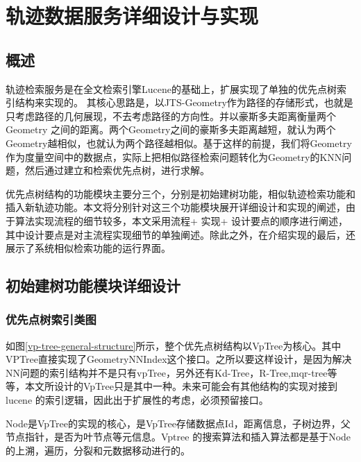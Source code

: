 \chapter{轨迹数据服务详细设计与实现}

\section{概述}
轨迹检索服务是在全文检索引擎Lucene的基础上，扩展实现了单独的优先点树索引结构来实现的。
其核心思路是，以JTS-Geometry作为路径的存储形式，也就是只考虑路径的几何展现，不去考虑路径的方向性。并以豪斯多夫距离衡量两个Geometry 之间的距离。两个Geometry之间的豪斯多夫距离越短，就认为两个Geometry越相似，也就认为两个路径越相似。基于这样的前提，我们将Geometry作为度量空间中的数据点，实际上把相似路径检索问题转化为Geometry的KNN问题，然后通过建立和检索优先点树，进行求解。

优先点树结构的功能模块主要分三个，分别是初始建树功能，相似轨迹检索功能和插入新轨迹功能。本文将分别针对这三个功能模块展开详细设计和实现的阐述，由于算法实现流程的细节较多，本文采用流程+ 实现+ 设计要点的顺序进行阐述，其中设计要点是对主流程实现细节的单独阐述。除此之外，在介绍实现的最后，还展示了系统相似检索功能的运行界面。

\section{初始建树功能模块详细设计}
\subsection{优先点树索引类图}
如图\ref{vp-tree-general-structure}所示，整个优先点树结构以VpTree为核心。其中VPTree直接实现了GeometryNNIndex这个接口。之所以要这样设计，是因为解决NN问题的索引结构并不是只有vpTree，另外还有Kd-Tree，R-Tree,mqr-tree等等\cite{DBLP:conf/nbis/Osborn17}，本文所设计的VpTree只是其中一种。未来可能会有其他结构的实现对接到lucene 的索引逻辑，因此出于扩展性的考虑，必须预留接口。

Node是VpTree的实现的核心，是VpTree存储数据点Id，距离信息，子树边界，父节点指针，是否为叶节点等元信息。Vptree 的搜索算法和插入算法都是基于Node 的上溯，遍历，分裂和元数据移动进行的。

